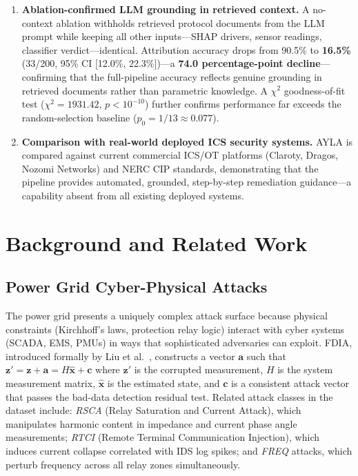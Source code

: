 \documentclass[twocolumn, 10pt, letterpaper]{article}
\begin{document}
\begin{enumerate}
    \item[\textbf{C4.}] \textbf{Ablation-confirmed LLM grounding in retrieved context.}
          A no-context ablation withholds retrieved protocol documents from the LLM
          prompt while keeping all other inputs---SHAP drivers, sensor readings,
          classifier verdict---identical.
          Attribution accuracy drops from 90.5\% to \textbf{16.5\%}
          (33/200, 95\% CI [12.0\%, 22.3\%])---a \textbf{74.0 percentage-point
          decline}---confirming that the full-pipeline accuracy reflects genuine
          grounding in retrieved documents rather than parametric knowledge.
          A $\chi^2$ goodness-of-fit test ($\chi^2 = 1931.42$, $p < 10^{-10}$)
          further confirms performance far exceeds the random-selection baseline
          ($p_0 = 1/13 \approx 0.077$).

    \item[\textbf{C5.}] \textbf{Comparison with real-world deployed ICS security systems.}
          AYLA is compared against current commercial ICS/OT platforms (Claroty,
          Dragos, Nozomi Networks) and NERC CIP standards, demonstrating that the
          pipeline provides automated, grounded, step-by-step remediation
          guidance---a capability absent from all existing deployed systems.
\end{enumerate}

\section{Background and Related Work}
\label{sec:background}

\subsection{Power Grid Cyber-Physical Attacks}

The power grid presents a uniquely complex attack surface because physical
constraints (Kirchhoff's laws, protection relay logic) interact with cyber systems
(SCADA, EMS, PMUs) in ways that sophisticated adversaries can exploit.
FDIA, introduced formally by Liu et al.\ \cite{liu2011fdia}, constructs a
vector $\mathbf{a}$ such that $\mathbf{z}' = \mathbf{z} + \mathbf{a} = H\hat{\mathbf{x}} + \mathbf{c}$
where $\mathbf{z}'$ is the corrupted measurement, $H$ is the system measurement
matrix, $\hat{\mathbf{x}}$ is the estimated state, and $\mathbf{c}$ is a
consistent attack vector that passes the bad-data detection residual test.
Related attack classes in the dataset include:
\textit{RSCA} (Relay Saturation and Current Attack), which manipulates
harmonic content in impedance and current phase angle measurements;
\textit{RTCI} (Remote Terminal Communication Injection), which induces current
collapse correlated with IDS log spikes; and
\textit{FREQ} attacks, which perturb frequency across all relay zones simultaneously.
\end{document}
